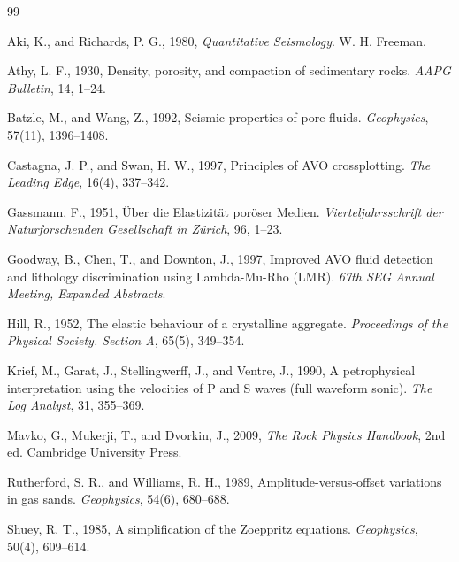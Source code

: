 \documentclass[11pt]{article}
\begin{document}
\newpage
\begin{thebibliography}{99}

 Aki, K., and Richards, P. G., 1980, \textit{Quantitative Seismology}. W. H. Freeman.

 Athy, L. F., 1930, Density, porosity, and compaction of sedimentary rocks. \textit{AAPG Bulletin}, 14, 1--24.

 Batzle, M., and Wang, Z., 1992, Seismic properties of pore fluids. \textit{Geophysics}, 57(11), 1396--1408.

 Castagna, J. P., and Swan, H. W., 1997, Principles of AVO crossplotting. \textit{The Leading Edge}, 16(4), 337--342.

 Gassmann, F., 1951, \"Uber die Elastizit\"at por\"oser Medien. \textit{Vierteljahrsschrift der Naturforschenden Gesellschaft in Z\"urich}, 96, 1--23.

 Goodway, B., Chen, T., and Downton, J., 1997, Improved AVO fluid detection and lithology discrimination using Lambda-Mu-Rho (LMR). \textit{67th SEG Annual Meeting, Expanded Abstracts}.

 Hill, R., 1952, The elastic behaviour of a crystalline aggregate. \textit{Proceedings of the Physical Society. Section A}, 65(5), 349--354.

 Krief, M., Garat, J., Stellingwerff, J., and Ventre, J., 1990, A petrophysical interpretation using the velocities of P and S waves (full waveform sonic). \textit{The Log Analyst}, 31, 355--369.

 Mavko, G., Mukerji, T., and Dvorkin, J., 2009, \textit{The Rock Physics Handbook}, 2nd ed. Cambridge University Press.

 Rutherford, S. R., and Williams, R. H., 1989, Amplitude-versus-offset variations in gas sands. \textit{Geophysics}, 54(6), 680--688.

 Shuey, R. T., 1985, A simplification of the Zoeppritz equations. \textit{Geophysics}, 50(4), 609--614.

\end{thebibliography}
\end{document}
